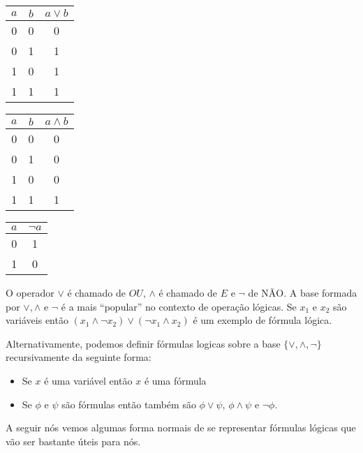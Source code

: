\begin{center}

\begin{tabular}{ c c | c }

    $a$ & $b$ & $a \lor b$ \\
    \hline
    0 & 0 & 0 \\
    0 & 1 & 1 \\
    1 & 0 & 1 \\
    1 & 1 & 1

\end{tabular}
\quad
\begin{tabular}{c c | c }

    $a$ & $b$ & $a \land b$ \\
    \hline
    0 & 0 & 0 \\
    0 & 1 & 0 \\
    1 & 0 & 0 \\
    1 & 1 & 1

\end{tabular}
\quad
\begin{tabular}{c | c}

    $a$ & $\lnot a$ \\
    \hline
    0 & 1 \\
    1 & 0

\end{tabular}

\end{center}

 O operador $\lor$ é chamado de $OU$, $\land$ é chamado de $E$ e $\lnot$ de $\text{NÃO}$. A base formada por $\lor, \land \text{ e } \lnot$ é a mais ``popular'' no contexto de operação lógicas. Se $x_{1} \text{ e } x_{2}$ são variáveis então $(x_{1} \land \lnot x_{2}) \lor (\lnot x_{1} \land x_{2})$ é um exemplo de fórmula lógica.

Alternativamente, podemos definir fórmulas logicas sobre a base $\{\lor, \land, \lnot\}$ recursivamente da seguinte forma:

\begin{itemize}

\item Se $x$ é uma variável então $x$ é uma fórmula

\item Se $\phi$ e $\psi$ são fórmulas então também são $\phi \lor \psi$, $\phi \land \psi$ e $\lnot \phi$.

\end{itemize}

A seguir nós vemos algumas forma normais de se representar fórmulas lógicas que vão ser bastante úteis para nós.

